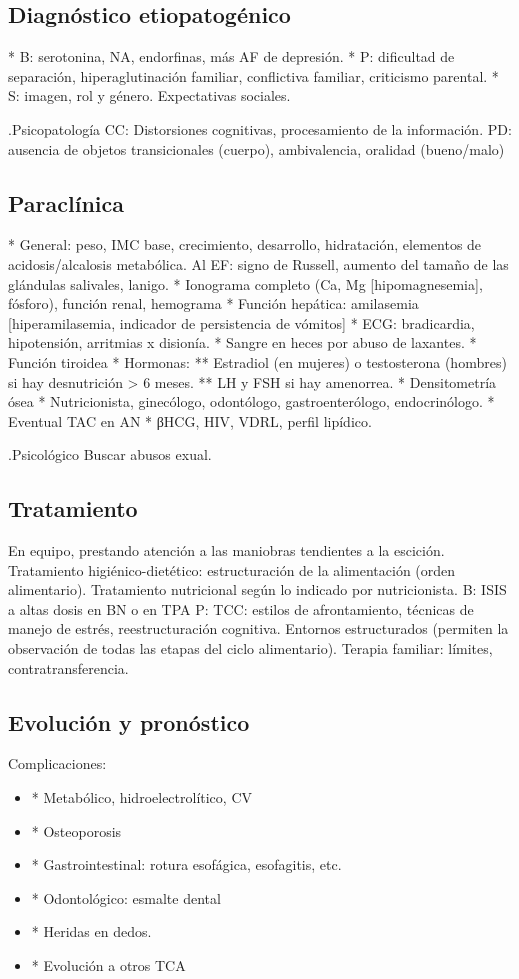 \subsection*{Diagnóstico etiopatogénico}
* B: serotonina, NA, endorfinas, más AF de depresión.
* P: dificultad de separación, hiperaglutinación familiar, conflictiva familiar, criticismo parental.
* S: imagen, rol y género. Expectativas sociales.

.Psicopatología
CC: Distorsiones cognitivas, procesamiento de la información.
PD: ausencia de objetos transicionales (cuerpo), ambivalencia, oralidad (bueno/malo)

\subsection*{Paraclínica}
* General: peso, IMC base, crecimiento, desarrollo, hidratación, elementos de acidosis/alcalosis metabólica. Al EF: signo de Russell, aumento del tamaño de las glándulas salivales, lanigo.
* Ionograma completo (Ca, Mg [hipomagnesemia], fósforo), función renal, hemograma
* Función hepática: amilasemia [hiperamilasemia, indicador de persistencia de vómitos]
* ECG: bradicardia, hipotensión, arritmias x disionía.
* Sangre en heces por abuso de laxantes.
* Función tiroidea
* Hormonas:
** Estradiol (en mujeres) o testosterona (hombres) si hay desnutrición > 6 meses.
** LH y FSH si hay amenorrea.
* Densitometría ósea
* Nutricionista, ginecólogo, odontólogo, gastroenterólogo, endocrinólogo.
* Eventual TAC en AN
* βHCG, HIV, VDRL, perfil lipídico.

.Psicológico
Buscar abusos exual.

\subsection*{Tratamiento}
En equipo, prestando atención a las maniobras tendientes a la escición.
Tratamiento higiénico-dietético: estructuración de la alimentación (orden alimentario).
Tratamiento nutricional según lo indicado por nutricionista.
B: ISIS a altas dosis en BN o en TPA
P: TCC: estilos de afrontamiento, técnicas de manejo de estrés, reestructuración cognitiva. Entornos estructurados (permiten la observación de todas las etapas del ciclo alimentario). Terapia familiar: límites, contratransferencia.

\subsection*{Evolución y pronóstico}
Complicaciones:
\begin{itemize}
	\item * Metabólico, hidroelectrolítico, CV
	\item * Osteoporosis
	\item * Gastrointestinal: rotura esofágica, esofagitis, etc.
	\item * Odontológico: esmalte dental
	\item * Heridas en dedos.
	\item * Evolución a otros TCA
\end{itemize}

